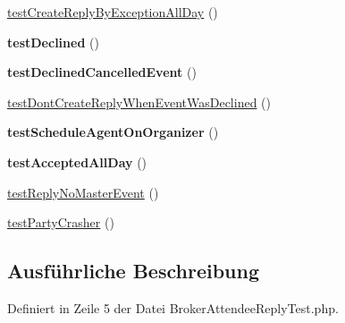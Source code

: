 \begin{DoxyCompactItemize}
\mbox{\hyperlink{class_sabre_1_1_v_object_1_1_i_tip_1_1_broker_attendee_reply_test_a5f19dbc44926441dc31ce6c50885a0b2}{test\+Create\+Reply\+By\+Exception\+All\+Day}} ()
\item 
\mbox{\label{class_sabre_1_1_v_object_1_1_i_tip_1_1_broker_attendee_reply_test_aeaeb115340c8b67e6f3cea36d444c9b5}} 
{\bfseries test\+Declined} ()
\item 
\mbox{\label{class_sabre_1_1_v_object_1_1_i_tip_1_1_broker_attendee_reply_test_ad925ac0078522b0d10ffb15616503004}} 
{\bfseries test\+Declined\+Cancelled\+Event} ()
\item 
\mbox{\hyperlink{class_sabre_1_1_v_object_1_1_i_tip_1_1_broker_attendee_reply_test_a33725aded47e250cde2aa588d697a1fa}{test\+Dont\+Create\+Reply\+When\+Event\+Was\+Declined}} ()
\item 
\mbox{\label{class_sabre_1_1_v_object_1_1_i_tip_1_1_broker_attendee_reply_test_a91c3a30d52d2ab9efab6424409fabfa5}} 
{\bfseries test\+Schedule\+Agent\+On\+Organizer} ()
\item 
\mbox{\label{class_sabre_1_1_v_object_1_1_i_tip_1_1_broker_attendee_reply_test_a9a73e0b991d6293003467c806b6351bb}} 
{\bfseries test\+Accepted\+All\+Day} ()
\item 
\mbox{\hyperlink{class_sabre_1_1_v_object_1_1_i_tip_1_1_broker_attendee_reply_test_a6a06c746e891ba375d68e9c36e4bc2d8}{test\+Reply\+No\+Master\+Event}} ()
\item 
\mbox{\hyperlink{class_sabre_1_1_v_object_1_1_i_tip_1_1_broker_attendee_reply_test_a666795eaa0113d9692970b93d5524757}{test\+Party\+Crasher}} ()
\end{DoxyCompactItemize}


\subsection{Ausführliche Beschreibung}


Definiert in Zeile 5 der Datei Broker\+Attendee\+Reply\+Test.\+php.



